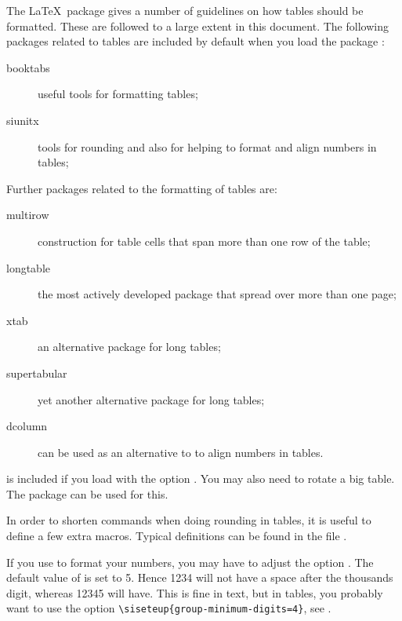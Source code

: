 \documentclass[REPORT=false, UKenglish, texlive=2020]{atlasdoc}
\begin{document}
The \LaTeX\ package  gives a number of guidelines on how tables should be formatted.
These are followed to a large extent in this document.
The following packages related to tables are included by default when you load the package :
\begin{description}
\item[booktabs] useful tools for formatting tables;
\item[siunitx] tools for rounding and also for helping to format and align numbers in tables;
\end{description}
Further packages related to the formatting of tables are:
\begin{description}
\item[multirow] construction for table cells that span more than one row of the table;
\item[longtable] the most actively developed package that spread over more than one page;
\item[xtab] an alternative package for long tables;
\item[supertabular] yet another alternative package for long tables;
\item[dcolumn] can be used as an alternative to  to align numbers in tables.
\end{description}
 is included if you load  with the option .
You may also need to rotate a big table.
The  package can be used for this.

In order to shorten commands when doing rounding in tables, it is useful to define a few extra macros.
Typical definitions can be found in the file .

If you use  to format your numbers,
you may have to adjust the option .
 The default value of  is set to 5.
Hence \num{1234} will not have a space after the thousands digit,
whereas \num{12345} will have.
This is fine in text, but in tables, you probably want to use the option
\verb|\siseteup{group-minimum-digits=4}|,
see .
\end{document}
